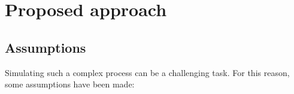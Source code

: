 \documentclass[conference]{IEEEtran}
\begin{document}



\section{Proposed approach}

\subsection{Assumptions}

    Simulating such a complex process can be a challenging task. For this reason, some assumptions have been made:

\end{document}
